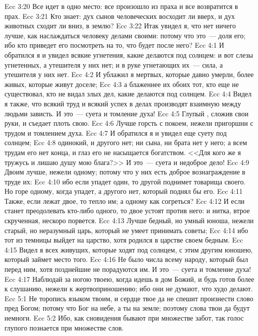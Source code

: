 \vs Ecc 3:20 Все идет в одно место: все произошло из праха и все возвратится в прах.
\vs Ecc 3:21 Кто знает: дух сынов человеческих восходит ли вверх, и дух животных сходит ли вниз, в землю?
\rsbpar\vs Ecc 3:22 Итак увидел я, что нет ничего лучше, как наслаждаться человеку делами своими: потому что это~--- доля его; ибо кто приведет его посмотреть на то, что будет после него?
\vs Ecc 4:1 И обратился я и увидел всякие угнетения, какие делаются под солнцем: и вот слезы угнетенных, а утешителя у них нет; и в руке угнетающих их~--- сила, а утешителя у них нет.
\vs Ecc 4:2 И ублажил я мертвых, которые давно умерли, более живых, которые живут доселе;
\vs Ecc 4:3 а блаженнее их обоих тот, кто еще не существовал, кто не видал злых дел, какие делаются под солнцем.
\rsbpar\vs Ecc 4:4 Видел я также, что всякий труд и всякий успех в делах производят взаимную между людьми зависть. И это~--- суета и томление духа!
\vs Ecc 4:5 Глупый , сложив свои руки, и съедает плоть свою.
\vs Ecc 4:6 Лучше горсть с покоем, нежели пригоршни с трудом и томлением духа.
\rsbpar\vs Ecc 4:7 И обратился я и увидел еще суету под солнцем;
\vs Ecc 4:8  одинокий, и другого нет; ни сына, ни брата нет у него; а всем трудам его нет конца, и глаз его не насыщается богатством. <<Для кого же я тружусь и лишаю душу мою блага?>> И это~--- суета и недоброе дело!
\rsbpar\vs Ecc 4:9 Двоим лучше, нежели одному; потому что у них есть доброе вознаграждение в труде их:
\vs Ecc 4:10 ибо если упадет один, то другой поднимет товарища своего. Но горе одному, когда упадет, а другого нет, который поднял бы его.
\vs Ecc 4:11 Также, если лежат двое, то тепло им; а одному как согреться?
\vs Ecc 4:12 И если станет преодолевать кто-либо одного, то двое устоят против него: и нитка, втрое скрученная, нескоро порвется.
\rsbpar\vs Ecc 4:13 Лучше бедный, но умный юноша, нежели старый, но неразумный царь, который не умеет принимать советы;
\vs Ecc 4:14 ибо тот из темницы выйдет на царство, хотя родился в царстве своем бедным.
\vs Ecc 4:15 Видел я всех живущих, которые ходят под солнцем, с этим другим юношею, который займет место того.
\vs Ecc 4:16 Не было числа всему народу, который был перед ним, хотя позднейшие не порадуются им. И это~--- суета и томление духа!
\rsbpar\vs Ecc 4:17 Наблюдай за ногою твоею, когда идешь в дом Божий, и будь готов более к слушанию, нежели к жертвоприношению; ибо они не думают, что худо делают.
\vs Ecc 5:1 Не торопись языком твоим, и сердце твое да не спешит произнести слово пред Богом; потому что Бог на небе, а ты на земле; поэтому слова твои да будут немноги.
\vs Ecc 5:2 Ибо, как сновидения бывают при множестве забот, так голос глупого познается при множестве слов.

